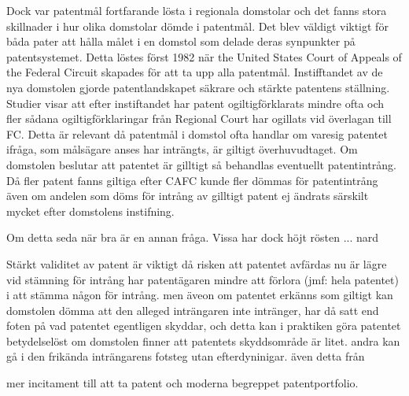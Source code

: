 Dock var patentmål fortfarande lösta i regionala domstolar och det fanns stora skillnader i hur olika
domstolar dömde i patentmål\cite{nard}. Det blev väldigt viktigt för båda pater att hålla målet i en
domstol som delade deras synpunkter på patentsystemet. Detta löstes först 1982 när the United States
Court of Appeals of the Federal Circuit skapades för att ta upp alla patentmål\cite{nard}. Instifftandet
av de nya domstolen gjorde patentlandskapet säkrare och stärkte patentens ställning. Studier visar att
efter instiftandet har patent ogiltigförklarats mindre ofta och fler sådana ogiltigförklaringar från
Regional Court har ogillats vid överlagan till FC. \cite{henry} Detta är relevant då patentmål i domstol
ofta handlar om varesig patentet ifråga, som målsägare anses har inträngts, är giltigt överhuvudtaget.
Om domstolen beslutar att patentet är gilltigt så behandlas eventuellt patentintrång. Då fler patent
fanns giltiga efter CAFC kunde fler dömmas för patentintrång även om andelen som döms för intrång av
gilltigt patent ej ändrats särskilt mycket efter domstolens instifning. 

Om detta seda när bra är en
annan fråga. Vissa har dock höjt rösten ... nard

Stärkt validitet av patent är viktigt då risken att patentet avfärdas nu är lägre vid stämning för
intrång har patentägaren mindre att förlora (jmf: hela patentet) i att stämma någon för intrång. men
äveon om patentet erkänns som giltigt kan domstolen dömma att den alleged inträngaren inte intränger,
har då satt end foten på vad patentet egentligen skyddar, och detta kan i praktiken göra patentet
betydelselöst om domstolen finner att patentets skyddsområde är litet. andra kan gå i den frikända
inträngarens fotsteg utan efterdyninigar. även detta från \cite{henry}

 mer incitament till att ta patent och moderna begreppet patentportfolio. 


